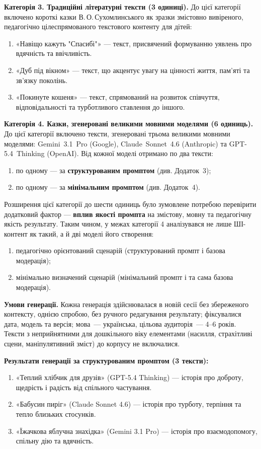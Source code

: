 \documentclass[14pt, a4paper]{extreport}
\begin{document}
\textbf{Категорія 3. Традиційні літературні тексти (3 одиниці).}
До цієї категорії включено короткі казки В.\,О.\,Сухомлинського як зразки змістовно вивіреного, педагогічно цілеспрямованого текстового контенту для дітей:
\begin{enumerate}
  \item «Навіщо кажуть "Спасибі"» --- текст, присвячений формуванню уявлень про вдячність та ввічливість.
  \item «Дуб під вікном» --- текст, що акцентує увагу на цінності життя, пам'яті та зв'язку поколінь.
  \item «Покинуте кошеня» --- текст, спрямований на розвиток співчуття, відповідальності та турботливого ставлення до іншого.
\end{enumerate}

\textbf{Категорія 4. Казки, згенеровані великими мовними моделями (6 одиниць).}
До цієї категорії включено тексти, згенеровані трьома великими мовними моделями: Gemini~3.1~Pro (Google), Claude~Sonnet~4.6 (Anthropic) та GPT-5.4~Thinking (OpenAI). Від кожної моделі отримано по два тексти:
\begin{enumerate}
  \item по одному --- за \textbf{структурованим промптом} (див. Додаток~3);
  \item по одному --- за \textbf{мінімальним промптом} (див. Додаток~4).
\end{enumerate}

Розширення цієї категорії до шести одиниць було зумовлене потребою перевірити додатковий фактор --- \textbf{вплив якості промпта} на змістову, мовну та педагогічну якість результату. Таким чином, у межах категорії 4 аналізувався не лише ШІ-контент як такий, а й дві моделі його створення:
\begin{enumerate}
  \item педагогічно орієнтований сценарій (структурований промпт і базова модерація);
  \item мінімально визначений сценарій (мінімальний промпт і та сама базова модерація).
\end{enumerate}
\newpage
\textbf{Умови генерації.}
Кожна генерація здійснювалася в новій сесії без збереженого контексту, однією спробою, без ручного редагування результату; фіксувалися дата, модель та версія; мова~--- українська, цільова аудиторія~--- 4--6 років. Тексти з неприйнятними для дошкільного віку елементами (насилля, страхітливі сцени, маніпулятивний зміст) до корпусу не включалися.

\textbf{Результати генерації за структурованим промптом (3 тексти):}
\begin{enumerate}
  \item «Теплий хлібчик для друзів» (GPT-5.4 Thinking) --- історія про доброту, щедрість і радість від спільного частування.
  \item «Бабусин пиріг» (Claude Sonnet 4.6) --- історія про турботу, терпіння та тепло близьких стосунків.
  \item «Їжачкова яблучна знахідка» (Gemini 3.1 Pro) --- історія про взаємодопомогу, спільну дію та вдячність.
\end{enumerate}
\end{document}
